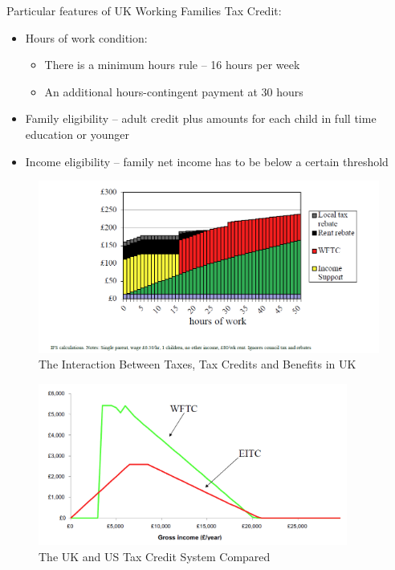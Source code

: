             Particular features of UK Working Families Tax Credit:
            \begin{itemize}
                \item Hours of work condition:
                \begin{itemize}
                    \item There is a minimum hours rule -- 16 hours per week
                    \item An additional hours-contingent payment at 30 hours    
                \end{itemize}
                \item Family eligibility -- adult credit plus amounts for each child in full time education or younger
                \item Income eligibility -- family net income has to be below a certain threshold
            \end{itemize}

            \begin{figure}[H]
                \centering
                \includegraphics[width=5.5in]{images/ch13/13_UK_Tax_and_trans.png}
                \caption{The Interaction Between Taxes, Tax Credits and Benefits in UK}
            \end{figure}

            \begin{figure}[H]
                \centering
                \includegraphics[width=4in]{images/ch13/13_USUK_credit_compare.png}
                \caption{The UK and US Tax Credit System Compared}
            \end{figure}

